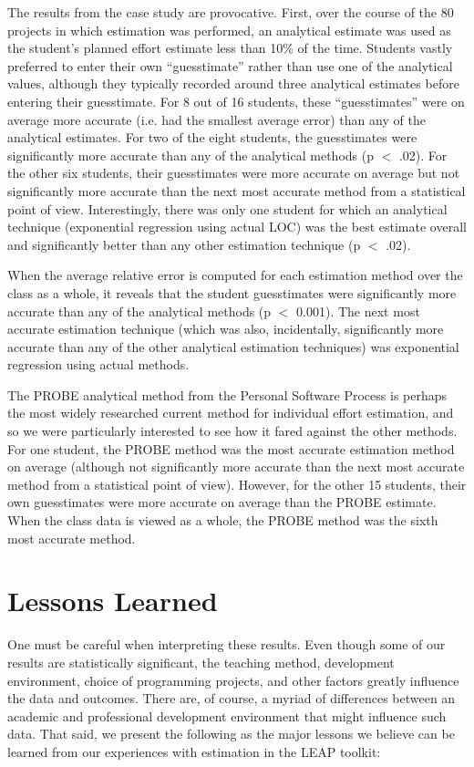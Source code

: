 The results from the case study are provocative.  First, over the course of
the 80 projects in which estimation was performed, an analytical estimate
was used as the student's planned effort estimate less than 10\% of the
time. Students vastly preferred to enter their own ``guesstimate'' rather
than use one of the analytical values, although they typically recorded
around three analytical estimates before entering their guesstimate.  For 8
out of 16 students, these ``guesstimates'' were on average more accurate
(i.e.  had the smallest average error) than any of the analytical
estimates. For two of the eight students, the guesstimates were
significantly more accurate than any of the analytical methods (p $<$ .02). For the
other six students, their guesstimates were more accurate on average but
not significantly more accurate than the next most accurate method from a
statistical point of view.  Interestingly, there was only one student for
which an analytical technique (exponential regression using actual LOC) was
the best estimate overall and significantly better than any other
estimation technique (p $<$ .02).

When the average relative error is computed for each estimation method over
the class as a whole, it reveals that the student guesstimates were
significantly more accurate than any of the analytical methods (p 
 $<$ 0.001).  The next most accurate estimation technique (which was also,
incidentally, significantly more accurate than any of the other analytical
estimation techniques) was exponential regression using actual
methods. 

The PROBE analytical method from the Personal Software Process is perhaps
the most widely researched current method for individual effort estimation,
and so we were particularly interested to see how it fared against the
other methods.  For one student, the PROBE method was the most accurate
estimation method on average (although not significantly more accurate than
the next most accurate method from a statistical point of view). However,
for the other 15 students, their own guesstimates were more accurate on
average than the PROBE estimate.  When the class data is viewed as a whole,
the PROBE method was the sixth most accurate method.

\section{Lessons Learned}

One must be careful when interpreting these results.  Even though some of
our results are statistically significant, the teaching method, development 
environment, choice of programming projects, and other factors 
greatly influence the data and outcomes.  There are, of course, a myriad of 
differences between an academic and professional development environment
that might influence such data. That said, we present the following as
the major lessons we believe can be learned from our experiences with
estimation in the LEAP toolkit:

